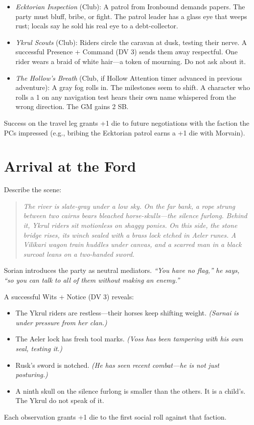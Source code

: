 \documentclass[10pt,twoside]{book}
\begin{document}
\begin{itemize}
\item \textit{Ecktorian Inspection} (Club): A patrol from Ironbound demands papers. The party must bluff, bribe, or fight. The patrol leader has a glass eye that weeps rust; locals say he sold his real eye to a debt-collector.
\item \textit{Ykrul Scouts} (Club): Riders circle the caravan at dusk, testing their nerve. A successful Presence + Command (DV 3) sends them away respectful. One rider wears a braid of white hair---a token of mourning. Do not ask about it.
\item \textit{The Hollow's Breath} (Club, if Hollow Attention timer advanced in previous adventure): A gray fog rolls in. The milestones seem to shift. A character who rolls a 1 on any navigation test hears their own name whispered from the wrong direction. The GM gains 2 SB.
\end{itemize}

Success on the travel leg grants +1 die to future negotiations with the faction the PCs impressed (e.g., bribing the Ecktorian patrol earns a +1 die with Morvain).

\section{Arrival at the Ford}

Describe the scene:

\begin{quote}
\textit{The river is slate-gray under a low sky. On the far bank, a rope strung between two cairns bears bleached horse-skulls---the silence furlong. Behind it, Ykrul riders sit motionless on shaggy ponies. On this side, the stone bridge rises, its winch sealed with a brass lock etched in Aeler runes. A Vilikari wagon train huddles under canvas, and a scarred man in a black surcoat leans on a two-handed sword.}
\end{quote}

Sorian introduces the party as neutral mediators. \textit{``You have no flag,'' he says, ``so you can talk to all of them without making an enemy.''}

\begin{mechanicbox}
A successful Wits + Notice (DV 3) reveals:
\begin{itemize}
\item The Ykrul riders are restless---their horses keep shifting weight. \textit{(Sarnai is under pressure from her clan.)}
\item The Aeler lock has fresh tool marks. \textit{(Voss has been tampering with his own seal, testing it.)}
\item Rusk's sword is notched. \textit{(He has seen recent combat---he is not just posturing.)}
\item A ninth skull on the silence furlong is smaller than the others. It is a child's. The Ykrul do not speak of it.
\end{itemize}
Each observation grants +1 die to the first social roll against that faction.
\end{mechanicbox}
\end{document}
